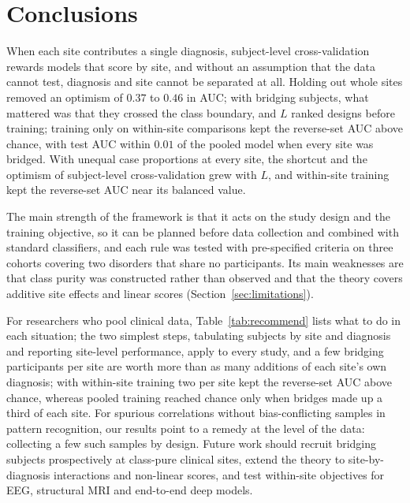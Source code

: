 \section{Conclusions}\label{sec:conclusions}

When each site contributes a single diagnosis, subject-level cross-validation rewards models that score by site, and without an assumption that the data cannot test, diagnosis and site cannot be separated at all. Holding out whole sites removed an optimism of $0.37$ to $0.46$ in AUC; with bridging subjects, what mattered was that they crossed the class boundary, and $L$ ranked designs before training; training only on within-site comparisons kept the reverse-set AUC above chance, with test AUC within $0.01$ of the pooled model when every site was bridged. With unequal case proportions at every site, the shortcut and the optimism of subject-level cross-validation grew with $L$, and within-site training kept the reverse-set AUC near its balanced value.

The main strength of the framework is that it acts on the study design and the training objective, so it can be planned before data collection and combined with standard classifiers, and each rule was tested with pre-specified criteria on three cohorts covering two disorders that share no participants. Its main weaknesses are that class purity was constructed rather than observed and that the theory covers additive site effects and linear scores (Section~\ref{sec:limitations}).

For researchers who pool clinical data, Table~\ref{tab:recommend} lists what to do in each situation; the two simplest steps, tabulating subjects by site and diagnosis and reporting site-level performance, apply to every study, and a few bridging participants per site are worth more than as many additions of each site's own diagnosis; with within-site training two per site kept the reverse-set AUC above chance, whereas pooled training reached chance only when bridges made up a third of each site. For spurious correlations without bias-conflicting samples in pattern recognition, our results point to a remedy at the level of the data: collecting a few such samples by design. Future work should recruit bridging subjects prospectively at class-pure clinical sites, extend the theory to site-by-diagnosis interactions and non-linear scores, and test within-site objectives for EEG, structural MRI and end-to-end deep models.
